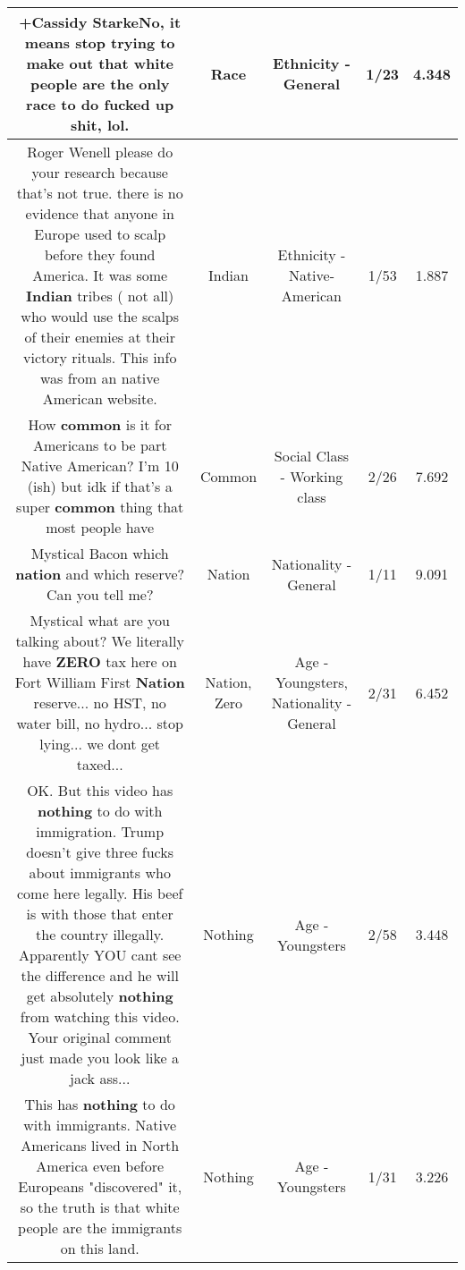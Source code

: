 \documentclass[11pt]{article}
\newlength\mylength
\begin{document}
\begin{center}
\begin{longtable}{|C{.65\mylength}|C{.30\mylength}|C{.12\mylength}|C{.12\mylength}|C{.12\mylength}|}
  \small +Cassidy StarkeNo, it means stop trying to make out that white people are the only \textbf{race} to do fucked up shit, lol.\normalsize   & Race & Ethnicity - General & 1/23 & 4.348 \\  \hline
  \small Roger Wenell please do your research because that's not true. there is no evidence that anyone in Europe used to scalp before they found America. It was some \textbf{Indian} tribes ( not all) who would use the scalps of their enemies at their victory rituals. This info was from an native American website.\normalsize   & Indian & Ethnicity - Native-American & 1/53 & 1.887 \\  \hline
  \small How \textbf{common} is it for Americans to be part Native American? I'm 10 (ish) but idk if that's a super \textbf{common} thing that most people have\normalsize   & Common & Social Class - Working class & 2/26 & 7.692 \\  \hline
  \small Mystical Bacon which \textbf{nation} and which  reserve? Can you tell me?\normalsize   & Nation & Nationality - General & 1/11 & 9.091 \\  \hline
  \small Mystical what are you talking about? We literally have \textbf{ZERO} tax here on Fort William First \textbf{Nation} reserve... no HST, no water bill, no hydro... stop lying... we dont get taxed...\normalsize   & Nation, Zero & Age - Youngsters, Nationality - General & 2/31 & 6.452 \\  \hline
  \small OK. But this video has \textbf{nothing} to do with immigration. Trump doesn't give three fucks about immigrants who come here legally. His beef is with those that enter the country illegally. Apparently YOU cant see the difference and he will get absolutely \textbf{nothing} from watching this video. Your original comment just made you look like a jack ass...\normalsize   & Nothing & Age - Youngsters & 2/58 & 3.448 \\  \hline
  \small This has \textbf{nothing} to do with immigrants. Native Americans lived in North America even before Europeans "discovered" it, so the truth is that white people are the immigrants on this land.\normalsize   & Nothing & Age - Youngsters & 1/31 & 3.226 \\  \hline

\end{longtable}
\end{center}
\end{document}

